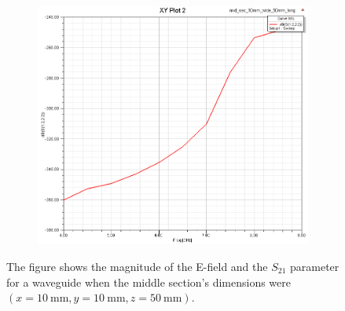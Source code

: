 \documentclass[12pt,a4paper]{article}
\begin{document}
\begin{figure}
\begin{subfigure}[b]{0.49\textwidth}
    \label{fig:2_1050_9ghz}
  \end{subfigure}
  \begin{subfigure}[b]{0.49\textwidth}
    \includegraphics[width=\textwidth]{./mid_sec_10mm_wide_50mm_long/s1222.png}
    \label{fig:2_1050_s1222}
  \end{subfigure}
  \caption{The figure shows the magnitude of the E-field and the $S_{21}$ parameter for a waveguide when the middle section's dimensions were $(x=\SI{10}{\milli\metre}, y=\SI{10}{\milli\metre}, z=\SI{50}{\milli\metre})$.}
  \label{fig:task2_1050}
\end{figure}
\end{document}
